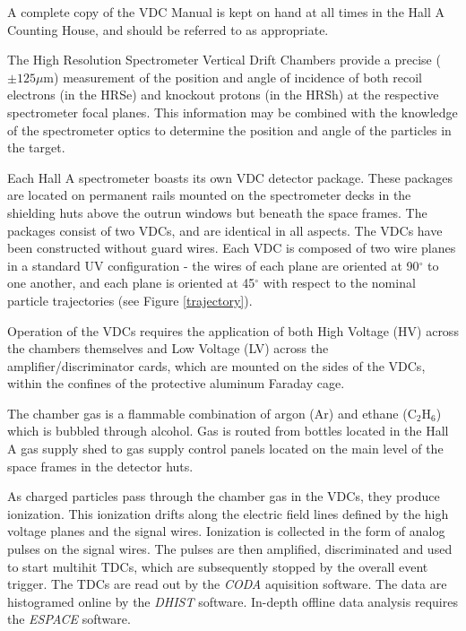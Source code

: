 


A complete copy of the VDC Manual is kept on hand at all times in
the Hall A Counting House, and should be referred to as appropriate.


The High Resolution Spectrometer Vertical Drift Chambers provide a
precise ($\pm 125\mu$m) measurement of the position and angle of
incidence of both recoil electrons (in the HRSe) and knockout protons
(in the HRSh) at the respective spectrometer focal planes.  This
information may be combined with the knowledge of the spectrometer
optics to determine the position and angle of the particles in the
target.

Each Hall A spectrometer boasts its own VDC detector package.  These
packages are located on permanent rails mounted on the spectrometer
decks in the shielding huts above the outrun windows but beneath the
space frames.  The packages consist of two VDCs, and are identical
in all aspects.  The VDCs have been constructed without guard wires.
Each VDC is composed of two wire planes in a standard UV
configuration - the wires of each plane are oriented at 90$^\circ$
to one another, and each plane is oriented at 45$^\circ$ with respect
to the nominal particle trajectories (see Figure \ref{trajectory}).


Operation of the VDCs requires the application of both High Voltage
(HV) across the chambers themselves and Low Voltage (LV) across the
amplifier/discriminator cards, which are mounted on the sides of 
the VDCs, within the confines of the protective aluminum Faraday cage.

The chamber gas is a flammable combination of argon (Ar) and ethane
(C$_2$H$_6$) which is bubbled through alcohol.  Gas is routed from
bottles located in the Hall A gas supply shed to gas supply control
panels located on the main level of the space frames in the detector
huts.

As charged particles pass through the chamber gas in the VDCs, they
produce ionization.  This ionization drifts along the electric field
lines defined by the high voltage planes and the signal wires.  
Ionization is collected in the form of analog pulses on the signal
wires.  The pulses are then amplified, discriminated and used to
start multihit TDCs, which are subsequently stopped by the overall
event trigger.  The TDCs are read out by the {\it CODA} aquisition
software.  The data are histogramed online by the {\it DHIST}
software.  In-depth offline data analysis requires the {\it ESPACE}
software.

